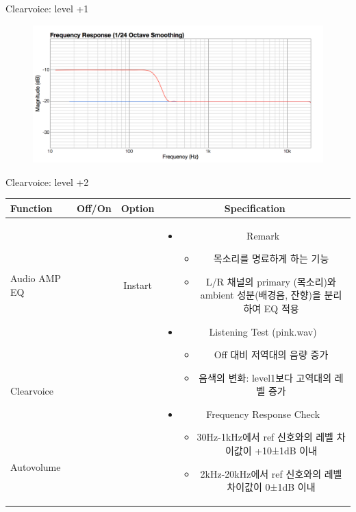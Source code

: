 \documentclass{beamer}
\begin{document}
\begin{frame}[t]{Clearvoice: level +1}
\begin{figure}[b]
\includegraphics[height=0.32\textwidth]{figure/cv1.png}
\end{figure}

\end{frame}


\begin{frame}[t]{Clearvoice: level +2}
\begin{tiny}
\begin{tabular}{@{}lccc@{}}
\toprule
Function & Off/On & Option & Specification \\
\midrule
Audio AMP EQ & \color{black}{Off} & Instart &
\multirow{14}{60mm}{
\begin{itemize}
\item Remark
	\begin{itemize}
	\item 목소리를 명료하게 하는 기능
	\item L/R 채널의 primary (목소리)와 ambient 성분(배경음, 잔향)을 분리하여 EQ 적용
	\end{itemize}
\item Listening Test (pink.wav)
	\begin{itemize}
	\item Off 대비 저역대의 음량 증가
	\item 음색의 변화: level1보다 고역대의 레벨 증가
	\end{itemize}
\item Frequency Response Check
  \begin{itemize}
  \item 30Hz-1kHz에서 ref 신호와의 레벨 차이값이 +10±1dB 이내
  \item 2kHz-20kHz에서 ref 신호와의 레벨 차이값이 0±1dB 이내
  \end{itemize}
\end{itemize}
} \\
Clearvoice & \color{blue}{On} & \color{blue}{+2} & \\
Autovolume & \color{black}{Off} & & \\

\end{tabular}
\end{tiny}
\end{frame}
\end{document}
